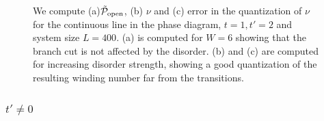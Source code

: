 \documentclass[twocolumn,amsmath,longbibliography,amssymb,superscriptaddress]{revtex4-1}
\begin{document}
\begin{figure}[t]
	\centering
	\hspace{0mm}
	
	\caption{We compute (a)$\tilde{\mathcal{P}}_{\rm open}$, (b) $\nu$ and (c) error in the quantization of $\nu$ for the continuous line in the phase diagram, $t=1,t'=2$ and system size $L=400$. (a) is computed for $W=6$ showing that the branch cut is not affected by the disorder. (b) and (c) are computed for increasing disorder strength, showing a good quantization of the resulting winding number far from the transitions. }
	\label{winding}
\end{figure}



\subsubsection{$t' \neq 0$}
\end{document}
